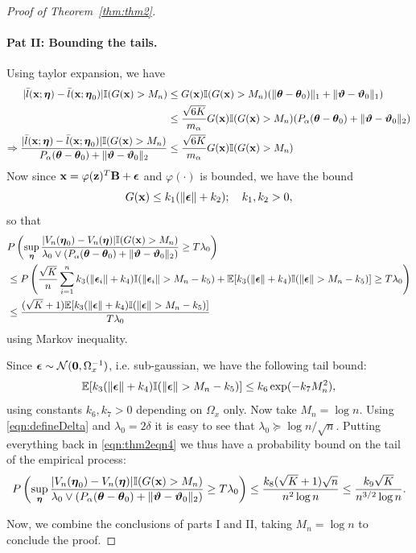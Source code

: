 \documentclass[11pt,letterpaper]{article}
\numberwithin{equation}{section}
\begin{document}
\begin{proof}[Proof of Theorem~\ref{thm:thm2}]
\paragraph{Pat II: Bounding the tails.} Using taylor expansion, we have
%
\begin{align*}
| \bar l({\bf{x}}; {\boldsymbol{\eta}}) -  \bar l({\bf{x}}; {\boldsymbol{\eta}}_0)| {\mathbb{I}}(G({\bf{x}}) > M_n) & \leq
G({\bf{x}}) {\mathbb{I}}(G({\bf{x}}) > M_n) (\| {\boldsymbol{\theta}} - {\boldsymbol{\theta}}_0)\|_1 + \| {\boldsymbol{\vartheta}} - {\boldsymbol{\vartheta}}_0 \|_1) \\
& \leq \frac{\sqrt{6K}}{m_\alpha} G({\bf{x}}) {\mathbb{I}}(G({\bf{x}}) > M_n) ( P_\alpha( {\boldsymbol{\theta}} - {\boldsymbol{\theta}}_0) + \| {\boldsymbol{\vartheta}} - {\boldsymbol{\vartheta}}_0 \|_2) \\
\Rightarrow \frac{| \bar l({\bf{x}}; {\boldsymbol{\eta}}) -  \bar l({\bf{x}}; {\boldsymbol{\eta}}_0)| {\mathbb{I}}(G({\bf{x}}) > M_n)}
{P_\alpha( {\boldsymbol{\theta}} - {\boldsymbol{\theta}}_0) + \| {\boldsymbol{\vartheta}} - {\boldsymbol{\vartheta}}_0 \|_2}
& \leq \frac{\sqrt{6K}}{m_\alpha} G({\bf{x}}) {\mathbb{I}}(G({\bf{x}}) > M_n)
\end{align*}
%
Now since ${\bf{x}} = \varphi({\bf{z}})^T {\mathbf{B}} + {\boldsymbol{\epsilon}}$ and $\varphi(\cdot)$ is bounded, we have the bound
%
$$
G({\bf{x}}) \leq k_1 ( \| {\boldsymbol{\epsilon}} \| + k_2 ); \quad k_1, k_2 > 0,
$$
%
so that
%
\begin{align}
& P \left( \sup_{\boldsymbol{\eta}} \frac{ |V_n({\boldsymbol{\eta}}_0) - V_n({\boldsymbol{\eta}})| {\mathbb{I}}(G({\bf{x}}) > M_n)}{\lambda_0 \vee
(P_\alpha({\boldsymbol{\theta}} - {\boldsymbol{\theta}}_0) + \| {\boldsymbol{\vartheta}} - {\boldsymbol{\vartheta}}_0 \|_2) } \geq T \lambda_0 \right) \notag\\
& \leq P \left( \frac{\sqrt K}{n} \sum_{i=1}^n k_3 (\| {\boldsymbol{\epsilon}}_i \| + k_4) {\mathbb{I}}(\| {\boldsymbol{\epsilon}}_i \| > M_n - k_5)
+ {\mathbb{E}} [ k_3 (\| {\boldsymbol{\epsilon}} \| + k_4) {\mathbb{I}}(\| {\boldsymbol{\epsilon}} \| > M_n - k_5) ] \geq T \lambda_0 \right) \notag\\
& \leq \frac{(\sqrt K + 1) {\mathbb{E}}[ k_3 (\| {\boldsymbol{\epsilon}} \| + k_4) {\mathbb{I}}(\| {\boldsymbol{\epsilon}} \| > M_n - k_5) ]}{T \lambda_0}
\label{eqn:thm2eqn4}
\end{align}
%
using Markov inequality.

Since ${\boldsymbol{\epsilon}} \sim {\cal{N}}({\bf 0}, \Omega_x^{-1})$, i.e. sub-gaussian, we have the following tail bound:
%
$$
{\mathbb{E}}[ k_3 (\| {\boldsymbol{\epsilon}} \| + k_4) {\mathbb{I}}(\| {\boldsymbol{\epsilon}} \| > M_n - k_5) ] \leq k_6 \exp(- k_7 M_n^2),
$$
%
using constants $k_6, k_7 > 0$ depending on $\Omega_x$ only. Now take $M_n = \log n$. Using \eqref{eqn:defineDelta} and $\lambda_0 = 2 \delta$ it is easy to see that $\lambda_0 \succeq \log n/ \sqrt n$.  Putting everything back in \eqref{eqn:thm2eqn4} we thus have a probability bound on the tail of the empirical process:
%
\begin{align}\label{eqn:thm2eqn5}
P \left( \sup_{\boldsymbol{\eta}} \frac{ |V_n({\boldsymbol{\eta}}_0) - V_n({\boldsymbol{\eta}})| {\mathbb{I}}(G({\bf{x}}) > M_n)}{\lambda_0 \vee
(P_\alpha({\boldsymbol{\theta}} - {\boldsymbol{\theta}}_0) + \| {\boldsymbol{\vartheta}} - {\boldsymbol{\vartheta}}_0 \|_2) } \geq T \lambda_0 \right) \leq
\frac{k_8 (\sqrt K + 1) \sqrt n}{n^2 \log n} \leq \frac{k_9 \sqrt K}{n^{3/2} \log n}.
\end{align}

Now, we combine the conclusions of parts I and II, taking $M_n = \log n$ to conclude the proof.
\end{proof}
\end{document}

